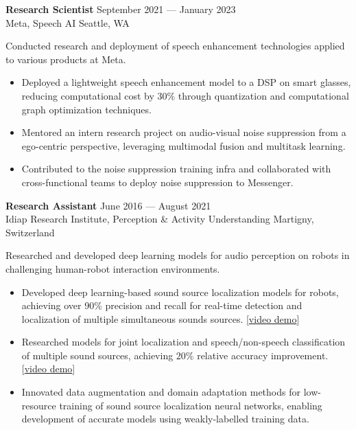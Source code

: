 \documentclass[a4paper,9pt]{extarticle} %
\begin{document}
\textbf{Research Scientist} \hfill September 2021 --- January 2023 \\
Meta, Speech AI \hfill Seattle, WA \\
\vspace{-1.5\parskip}

Conducted research and deployment of speech enhancement technologies applied to various products at Meta.
\vspace{-.9\parskip}
\begin{itemize}[nosep]
  \item Deployed a lightweight speech enhancement model to a DSP on smart glasses, reducing computational cost by 30\% through quantization and computational graph optimization techniques.
  \item Mentored an intern research project on audio-visual noise suppression from a ego-centric perspective, leveraging multimodal fusion and multitask learning.
  \item Contributed to the noise suppression training infra and collaborated with cross-functional teams to deploy noise suppression to Messenger.
\end{itemize}

\textbf{Research Assistant} \hfill June 2016 --- August 2021 \\
Idiap Research Institute, Perception \& Activity Understanding  \hfill Martigny, Switzerland \\
\vspace{-1.5\parskip}

Researched and developed deep learning models for audio perception on robots in challenging human-robot interaction environments.
\vspace{-.9\parskip}
\begin{itemize}[nosep]
  \item Developed deep learning-based sound source localization models for robots, achieving over 90\% precision and recall for real-time detection and localization of multiple simultaneous sounds sources. [\href{https://www.youtube.com/watch?v=_4EwuVlE_pU}{video demo}]
  \item Researched models for joint localization and speech/non-speech classification of multiple sound sources, achieving 20\% relative accuracy improvement. [\href{https://www.youtube.com/watch?v=O7bQvg03RTc}{video demo}]
  \item Innovated data augmentation and domain adaptation methods for low-resource training of sound source localization neural networks, enabling development of accurate models using weakly-labelled training data.
\end{itemize}
\end{document}
